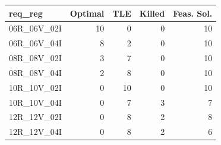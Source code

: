 
\begin{tabular}{lrrrr}
\toprule
req\_reg & Optimal & TLE & Killed & Feas. Sol.\\
\midrule
06R\_06V\_02I & 10 & 0 & 0 & 10\\
06R\_06V\_04I & 8 & 2 & 0 & 10\\
08R\_08V\_02I & 3 & 7 & 0 & 10\\
08R\_08V\_04I & 2 & 8 & 0 & 10\\
10R\_10V\_02I & 0 & 10 & 0 & 10\\
\addlinespace
10R\_10V\_04I & 0 & 7 & 3 & 7\\
12R\_12V\_02I & 0 & 8 & 2 & 8\\
12R\_12V\_04I & 0 & 8 & 2 & 6\\
\bottomrule
\end{tabular}
